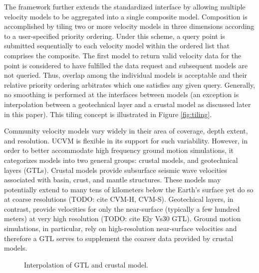 The framework further extends the standardized interface by allowing multiple velocity models to be aggregated into a single composite model. Composition is accomplished by tiling two or more velocity models in three dimensions according to a user-specified priority ordering. Under this scheme, a query point is submitted sequentially to each velocity model within the ordered list that comprises the composite. The first model to return valid velocity data for the point is considered to have fulfilled the data request and subsequent models are not queried. Thus, overlap among the individual models is acceptable and their relative priority ordering arbitrates which one satisfies any given query. Generally, no smoothing is performed at the interfaces between models (an exception is interpolation between a geotechnical layer and a crustal model as discussed later in this paper). This tiling concept is illustrated in Figure \ref{fig:tiling}.

Community velocity models vary widely in their area of coverage, depth extent, and resolution. UCVM is flexible in its support for such variability. However, in order to better accommodate high frequency ground motion simulations, it categorizes models into two general groups: crustal models, and geotechnical layers (GTLs). Crustal models provide subsurface seismic wave velocities associated with basin, crust, and mantle structures. These models may potentially extend to many tens of kilometers below the Earth's surface yet do so at coarse resolutions (TODO: cite CVM-H, CVM-S). Geotechical layers, in contrast, provide velocities for only the near-surface (typically a few hundred meters) at very high resolution (TODO: cite Ely Vs30 GTL). Ground motion simulations, in particular, rely on high-resolution near-surface velocities and therefore a GTL serves to supplement the coarser data provided by crustal models.
\begin{figure}
\centering
{}
\caption{Interpolation of GTL and crustal model.}\label{fig:interpolation}
\end{figure}

